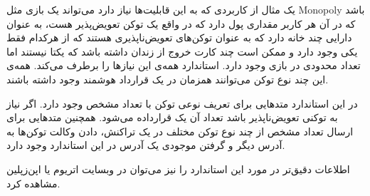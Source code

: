 یک مثال از کاربردی که به این قابلیت‌ها نیاز دارد می‌تواند یک بازی مثل
\gls{Monopoly}
باشد
که در آن هر کاربر مقداری پول دارد که در واقع یک توکن تعویض‌پذیر هست،
به عنوان دارایی چند خانه دارد که به عنوان توکن‌های تعویض‌ناپذیری هستند که از هرکدام فقط یکی وجود دارد
و ممکن است چند کارت خروج از زندان داشته باشد که یکتا نیستند اما تعداد محدودی در بازی وجود دارد. استاندارد
همه‌ی این نیازها را برطرف می‌کند. همه‌ی این چند نوع توکن می‌توانند همزمان در یک قرارداد هوشمند وجود داشته باشند.

در این استاندارد متدهایی برای تعریف نوعی توکن با تعداد مشخص وجود دارد.
اگر نیاز به توکنی تعویض‌ناپذیر باشد تعداد آن یک قرارداده می‌شود.
همچنین متدهایی برای ارسال تعداد مشخص از چند نوع توکن مختلف در یک تراکنش،
دادن وکالت توکن‌ها به آدرس دیگر و گرفتن موجودی یک آدرس در این استاندارد وجود دارد.

اطلاعات دقیق‌تر در مورد این استاندارد را نیز می‌توان در وبسایت
اتریوم
یا
اپن‌زپلین
مشاهده کرد.
